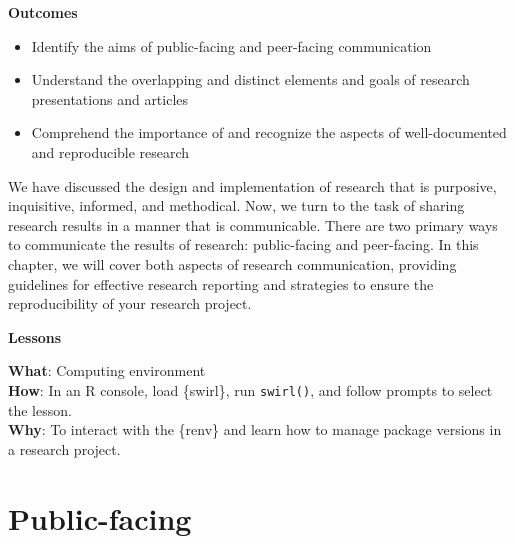 \documentclass[
  letterpaper,
]{latex/krantz}
\providecommand{\tightlist}{%
  \setlength{\itemsep}{0pt}\setlength{\parskip}{0pt}}\usepackage{longtable,booktabs,array}
\theoremstyle{definition}
\theoremstyle{remark}
\begin{document}
\begin{tcolorbox}[enhanced jigsaw, bottomrule=.15mm, leftrule=.75mm, toprule=.15mm, breakable, colframe=quarto-callout-color-frame, arc=.35mm, left=2mm, rightrule=.15mm, opacityback=0, colback=white]

\textbf{ Outcomes}

\begin{itemize}
\tightlist
\item
  Identify the aims of public-facing and peer-facing communication
\item
  Understand the overlapping and distinct elements and goals of research
  presentations and articles
\item
  Comprehend the importance of and recognize the aspects of
  well-documented and reproducible research
\end{itemize}

\end{tcolorbox}

We have discussed the design and implementation of research that is
purposive, inquisitive, informed, and methodical. Now, we turn to the
task of sharing research results in a manner that is communicable. There
are two primary ways to communicate the results of research:
public-facing and peer-facing. In this chapter, we will cover both
aspects of research communication, providing guidelines for effective
research reporting and strategies to ensure the reproducibility of your
research project.

\begin{tcolorbox}[enhanced jigsaw, bottomrule=.15mm, leftrule=.75mm, toprule=.15mm, breakable, colframe=quarto-callout-color-frame, arc=.35mm, left=2mm, rightrule=.15mm, opacityback=0, colback=white]

\textbf{ Lessons}

\textbf{What}: Computing environment\\
\textbf{How}: In an R console, load \{swirl\}, run \texttt{swirl()}, and
follow prompts to select the lesson.\\
\textbf{Why}: To interact with the \{renv\} and learn how to manage
package versions in a research project.

\end{tcolorbox}

\section{Public-facing}\label{sec-contribute-public-facing}
\end{document}
